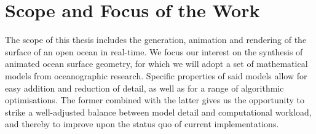\section{Scope and Focus of the Work}
\label{sec:scope_and_focus}
The scope of this thesis includes the generation, animation and rendering of the
surface of an open ocean in real-time. We focus our interest on the synthesis of
animated ocean surface geometry, for which we will adopt a set of mathematical
models from oceanographic research. Specific properties of said models allow for
easy addition and reduction of detail, as well as for a range of algorithmic
optimisations. The former combined with the latter gives us the opportunity to
strike a well-adjusted balance between model detail and computational workload,
and thereby to improve upon the status quo of current implementations.
%
%
